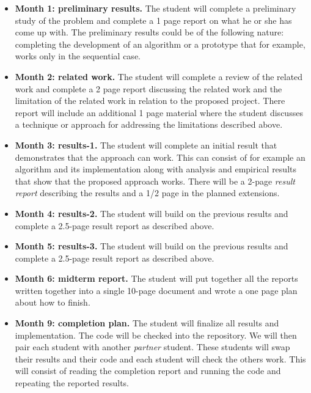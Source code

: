 \documentclass[11pt]{article}
\begin{document}
\begin{itemize}

\item {\bf Month 1: preliminary results.}  The student will complete a
  preliminary study of the problem and complete a 1 page report on
  what he or she has come up with. The preliminary results could be of
  the following nature: completing the development of an algorithm or
  a prototype that for example, works only in the sequential case.

\item {\bf Month 2: related work.}  The student will complete a review
  of the related work and complete a 2 page report discussing the
  related work and the limitation of the related work in relation to
  the proposed project.  There report will include an additional 1
  page material where the student discusses a technique or approach
  for addressing the limitations described above.

\item {\bf Month 3: results-1.}  The student will complete an initial
  result that demonstrates that the approach can work. This can
  consist of for example an algorithm and its implementation along
  with analysis and empirical results that show that the proposed
  approach works.  There will be a 2-page {\em result report}
  describing the results and a 1/2 page in the planned extensions.

\item {\bf Month 4: results-2.}  The student will build on the
  previous results and complete a 2.5-page result report as described
  above.

\item {\bf Month 5: results-3.}  The student will build on the
  previous results and complete a 2.5-page result report as described
  above.

\item {\bf Month 6: midterm report.}  The student will put together
  all the reports written together into a single 10-page document and
  wrote a one page plan about how to finish.


\item {\bf Month 9: completion plan.}  The student will finalize all
  results and implementation.  The code will be checked into the
  repository.  We will then pair each student with another {\em
    partner} student.  These students will swap their results and
  their code and each student will check the others work.  This will
  consist of reading the completion report and running the code and
  repeating the reported results.


\end{itemize}
\end{document}
